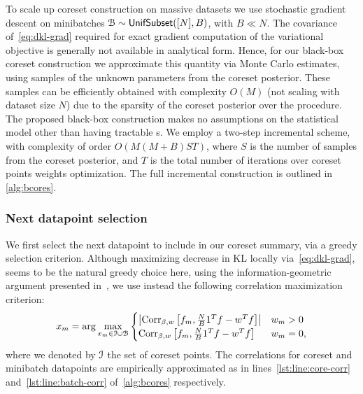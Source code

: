 To scale up coreset construction on massive datasets we use stochastic gradient descent on minibatches $\mathcal{B} \sim {\sf{UnifSubset}}([N], B)$, with $B \ll N$.
The covariance of~\cref{eq:dkl-grad} required for exact gradient computation of the variational objective is generally not available in analytical form. Hence, for our black-box coreset construction we approximate this quantity via Monte Carlo estimates, using samples of the unknown parameters from the coreset posterior. These samples can be efficiently obtained with complexity $O(M)$ (not scaling with dataset size $N$) due to the sparsity of the coreset posterior over the procedure. The proposed black-box construction makes no assumptions on the statistical model other than having tractable \blik{}s. We employ a two-step incremental scheme, with complexity of order $O\left(M(M+B)ST\right)$, where $S$ is the number of samples from the coreset posterior, and $T$ is the total number of iterations over coreset points weights optimization. The full incremental construction is outlined in \cref{alg:bcores}.


\subsubsection{Next datapoint selection}
We first select the next datapoint to include in our coreset summary, via a greedy selection criterion. Although maximizing decrease in KL locally via~\cref{eq:dkl-grad}, seems to be the natural greedy choice here, using the information-geometric argument presented in~\cite{campbell19neurips}, we use instead the following correlation maximization criterion:
\[
x_{m} = \arg \underset{x_m \in \mathcal{I} \cup \mathcal{B} }{\max}
\begin{cases}
	\left|\operatorname{Corr}_{\beta,w}\left[f_m, \frac{N}{B}1^Tf - w^T f\right]\right| & w_m>0 \\
	\operatorname{Corr}_{\beta,w}\left[f_m, \frac{N}{B}1^Tf - w^T f\right] & w_m=0,
\end{cases}
\label{eq:greedy-select}
\]
where we denoted by $\mathcal{I}$ the set of coreset points.
The correlations for coreset and minibatch datapoints are empirically approximated  as in lines~\ref{lst:line:core-corr} and~\ref{lst:line:batch-corr} of~\cref{alg:bcores} respectively.
\begin{comment}
\[
\hcorr = \diag \left[ \frac{1}{S} \sum_{s=1}^{S} g_s g_s^T \right]^{-\frac{1}{2}} \left(\frac{1}{S} \sum_{s=1}^{S} g_s \left(\frac{N}{B}1^Tg_s- w^Tg_s\right) \right),
\label{eq:empirical-corr}
\]
where 
 \[
 g_s:= \begin{bmatrix}
		f_1(\theta_s) \\
		\vdots \\
		f_N(\theta_s)
\end{bmatrix}
-
\frac{1}{S}\sum_{r=1}^{S}
 \begin{bmatrix}
f_1(\theta_r) \\
\vdots \\
f_N(\theta_r)
\end{bmatrix}.
\label{eq:sampled-potentials}
\]
\end{comment}

